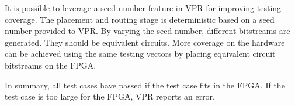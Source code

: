 It is possible to leverage a seed number feature in VPR for improving testing coverage. 
The placement and routing stage is deterministic based on a seed number provided to VPR. By varying
the seed number, different bitstreams are generated. They should be equivalent circuits. More coverage 
on the hardware can be achieved using the same testing vectors by
placing equivalent circuit bitstreams on the FPGA. \par

In summary, all test cases have passed if the test case fits in the FPGA. If the test case
is too large for the FPGA, VPR reports an error. \par